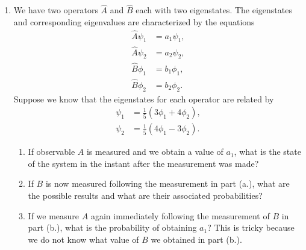 \documentclass[a4paper, 12pt]{config/homework}
\begin{document}
\begin{enumerate}
\begin{enumerate}[label=(\alph*.)]
\end{enumerate}
\pagebreak
\item We have two operators \(\hat{A}\) and \(\hat{B}\) each with two eigenstates. The eigenstates and corresponding eigenvalues are characterized by the equations
\begin{align*}
\hat{A}\psi_1 &= a_1 \psi_1, \\
\hat{A}\psi_2 &= a_2 \psi_2, \\
\hat{B}\phi_1 &= b_1 \phi_1, \\
\hat{B}\phi_2 &= b_2 \phi_2.
\end{align*}
Suppose we know that the eigenstates for each operator are related by
\begin{align*}
\psi_1 &= \frac{1}{5}\left(3\phi_1 + 4\phi_2\right), \\
\psi_2 &= \frac{1}{5}\left(4\phi_1 - 3\phi_2\right).
\end{align*}
\begin{enumerate}[label=(\alph*.)]
\item If observable \(A\) is measured and we obtain a value of \(a_1\), what is the state of the system in the instant after the measurement was made?



\item If \(B\) is now measured following the measurement in part (a.), what are the possible results and what are their associated probabilities?



\item If we measure \(A\) again immediately following the measurement of \(B\) in part (b.), what is the probability of obtaining \(a_1\)? This is tricky because we do not know what value of \(B\) we obtained in part (b.).



\end{enumerate}
\end{enumerate}
\end{document}
